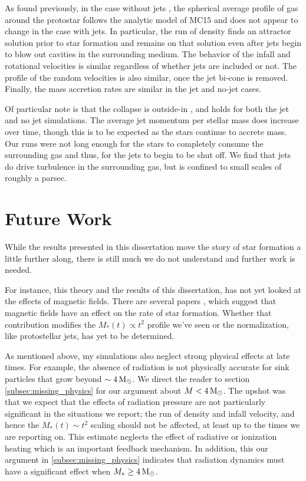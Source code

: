 \documentclass[../dissertation.tex]{subfiles}
\begin{document}
As found previously, in the case without jets \citep{2017MNRAS.465.1316M}, 
the spherical average profile of gas around the protostar follows the analytic model of MC15 and does not appear to change in the case with jets.
In particular, the run of density finds an attractor solution prior to star formation and remains on that solution even after jets begin to blow out cavities in the surrounding medium.
The behavior of the infall and rotational velocities is similar regardless of whether jets are included or not.
The profile of the random velocities is also similar, once the jet bi-cone is removed.  Finally, the mass accretion rates are similar in the jet and no-jet cases.

Of particular note is that the collapse is outside-in  \citep{2017MNRAS.465.1316M}, and holds for both the jet and no jet simulations.
The average jet momentum per stellar mass does increase over time, though this is to be expected as the stars continue to accrete mass.
Our runs were not long enough for the stars to completely consume the surrounding gas and thus, for the jets to begin to be shut off.
We find that jets do drive turbulence in the surrounding gas, but is confined to small scales of roughly a parsec.

\section{Future Work}
While the results presented in this dissertation move the story of star formation a little further along, 
there is still much we do not understand and further work is needed. 

For instance, this theory and the results of this dissertation, has not yet looked at the effects of magnetic fields. 
There are several papers \citep{2009ApJ...704..891L,2015ApJ...808...48B,2017ApJ...838...40M} , which suggest that magnetic fields have an effect on the rate of star formation. 
Whether that contribution modifies the $M_*(t) \propto t^2$ profile we've seen or the normalization, like protostellar jets, has yet to be determined. 

As mentioned above, my simulations also neglect strong physical effects at late times. 
For example, the absence of radiation is not physically accurate for sink particles that grow beyond $\sim 4 {\,\rm M}_\odot$.
We direct the reader to section \ref{subsec:missing_physics} for our argument about $M < 4 {\,\rm M}_\odot$. 
The upshot was that we expect that the effects of radiation pressure are not particularly significant in the situations we report; 
the run of density and infall velocity, and hence the $M_*(t)\sim t^2$ scaling should not be affected, at least up to the times we are reporting on. 
This estimate neglects the effect of radiative or ionization heating which is an important feedback mechanism. 
In addition, this our argument in \ref{subsec:missing_physics} indicates that radiation dynamics must have a significant effect when $M_* \ge 4 {\,\rm M}_\odot$. 
\end{document}
